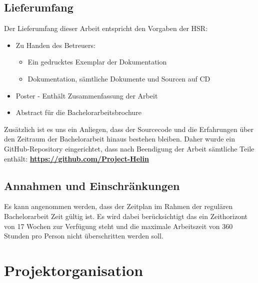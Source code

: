 \subsection{Lieferumfang}
Der Lieferumfang dieser Arbeit entspricht den Vorgaben der HSR:
\begin{itemize}
	\item{Zu Handen des Betreuers:
	\begin{itemize}
		\item{Ein gedrucktes Exemplar der Dokumentation}
		\item{Dokumentation, sämtliche Dokumente und Sourcen auf CD}
	\end{itemize}}
	\item{Poster - Enthält Zusammenfassung der Arbeit}
	\item{Abstract für die Bachelorarbeitsbrochure}
\end{itemize}
Zusätzlich ist es uns ein Anliegen, dass der Sourcecode und die Erfahrungen über den Zeitraum der Bachelorarbeit hinaus bestehen bleiben. Daher wurde ein GitHub-Repository eingerichtet, dass nach Beendigung der Arbeit sämtliche Teile enthält: \textbf{\url{https://github.com/Project-Helin}}

\subsection{Annahmen und Einschränkungen}
Es kann angenommen werden, dass der Zeitplan im Rahmen der regulären Bachelorarbeit Zeit gültig ist. Es wird dabei berücksichtigt das ein Zeithorizont von 17 Wochen zur Verfügung steht und die maximale Arbeitszeit von 360 Stunden pro Person nicht überschritten werden soll.

\newpage

\section{Projektorganisation}
